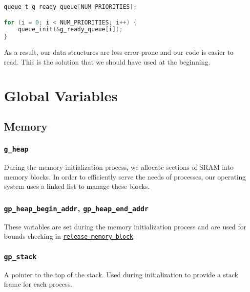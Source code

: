 \documentclass[12pt]{report}
\begin{document}
\begin{minipage}{\textwidth}
\begin{lstlisting}[language=C]
queue_t g_ready_queue[NUM_PRIORITIES];

for (i = 0; i < NUM_PRIORITIES; i++) {
    queue_init(&g_ready_queue[i]);
}
\end{lstlisting}
\end{minipage}

As a result, our data structures are less error-prone and our code is easier to read. This is the solution that we should have used at the beginning.

\appendix


\chapter{Global Variables}

\section{Memory}

\subsection{\texttt{g_heap}}

During the memory initialization process, we allocate sections of SRAM into memory blocks. In order to efficiently serve the needs of processes, our operating system uses a linked list to manage these blocks.

\subsection{\texttt{gp_heap_begin_addr}, \texttt{gp_heap_end_addr}}

These variables are set during the memory initialization process and are used for bounds checking in \hyperref[alg:releasingmemoryblocks]{\texttt{release_memory_block}}.

\subsection{\texttt{gp_stack}}

A pointer to the top of the stack. Used during initialization to provide a stack frame for each process.
\end{document}
